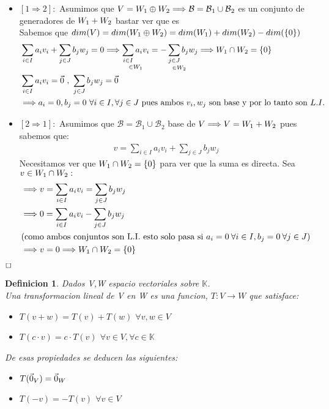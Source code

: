 \documentclass[]{article}
\newtheorem{definition}{Definicion}
\newenvironment{proof}{\noindent{\bf Prueba:}}{$\hfill \Box$ \vspace{10pt}}
\newcommand{\K}{
    \mathbb{K}
}
\newcommand{\ida}{\Longrightarrow}
\newcommand{\base}{\text{$\mathcal{B}$}}
\begin{document}
\begin{proof}
    \begin{itemize}
        \item $[1 \ida 2]:$ Asumimos que $V=\W{1}\oplus\W{2} \ida \base = \base_1 \cup \base_2$ es un conjunto de generadores de
        $\text{$W_{1}$}+\text{$W_{2}$}$ bastar ver que es \li\\
        Sabemos que $dim(V)=dim(\text{$W_{1}$}\oplus\text{$W_{2}$})=dim(\text{$W_{1}$})+dim(\text{$W_{2}$})-dim(\text{$\{ {0} \}$})$
        \begin{align*}
            &\sum_{i \in I} a_i v_i + \sum_{j \in J} b_j w_j = 0 \ida
            \underset{\in \W{1}}{\sum_{i \in I} a_i v_i} = \underset{\in \W{2}}{-\sum_{j \in J} b_j w_j} \ida \W{1}\cap\W{2}=\conjunto{0}\\
            &\sum_{i \in I} a_i v_i =  \cero \text{ , } \sum_{j \in J} b_j w_j = \cero\\
            &\ida a_i=0,b_j=0 \text{ $\forall i \in I, \forall j \in J$ pues ambos $v_i,w_j$ son base y por lo tanto son } \li
        \end{align*}
        \item $[2 \ida 1]:$ Asumimos que $\base=\base_1 \cup \base_2$  base de $V \ida V=\W{1}+\W{2}$ pues sabemos que:
        \begin{align*}
            v=\sum_{i \in I}a_i v_i + \sum_{j \in J}b_j w_j
        \end{align*}
        Necesitamos ver que $\text{$W_{1}$}\cap\text{$W_{2}$}=\text{$\{ {0} \}$}$ para ver que la suma es directa. Sea $v\in\text{$W_{1}$}\cap\text{$W_{2}$}:$
        \begin{align*}
            &\ida v=\sum_{i \in I}a_i v_i = \sum_{j \in J}b_j w_j\\
            &\ida 0=\sum_{i \in I}a_i v_i - \sum_{j \in J}b_j w_j\\
            &(\text{como ambos conjuntos son L.I. esto solo pasa si } a_i=0 \:\forall i \in I,b_j=0 \:\forall j \in J)\\
            &\ida v=0\ida \W{1}\cap\W{2}=\conjunto{0}
        \end{align*}
    \end{itemize}
\end{proof}

\newpage
\begin{definition}
    Dados V,W espacio vectoriales sobre $\K$.\\
    Una transformacion lineal de V en W es una funcion, $T:V \rightarrow W$ que satisface:
    \begin{itemize}
        \item $T(v+w)=T(v)+T(w)$ \quad $\forall v,w \in V$
        \item $T(c\cdot v)= c\cdot T(v)$ \quad $\forall v\in V, \forall c \in \K$
    \end{itemize}
    De esas propiedades se deducen las siguientes:
    \begin{itemize}
        \item $T(\text{$\vec{0}$}_V)=\text{$\vec{0}$}_W$
        \item $T(-v)=-T(v)$ \quad $\forall v \in V$
    \end{itemize}
\end{definition}
\end{document}
